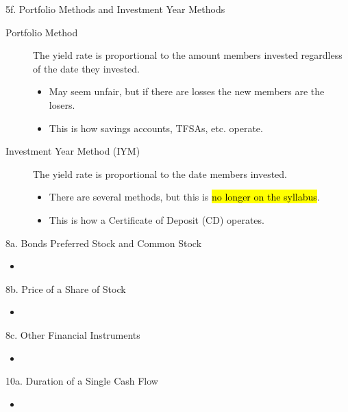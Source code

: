 \begin{CHPT_SUMM_AUTO}[label = {L.-5f}]{5f. Portfolio Methods and Investment Year Methods}
\begin{description}
	\item[Portfolio Method]	The yield rate is proportional to the amount members invested regardless of the date they invested.
		\begin{itemize}[leftmargin = *]
		\item	May seem unfair, but if there are losses the new members are the losers.
		\item	This is how savings accounts, TFSAs, etc. operate.
		\end{itemize}
	\item[Investment Year Method (IYM)]	The yield rate is proportional to the date members invested.
		\begin{itemize}[leftmargin = *]
		\item	There are several methods, but this is \hl{no longer on the syllabus}.
		\item	This is how a Certificate of Deposit (CD) operates.
		\end{itemize}
\end{description}
\end{CHPT_SUMM_AUTO}

\begin{CHPT_SUMM_AUTO}[label = {L.-8a}]{8a. Bonds Preferred Stock and Common Stock}
	\begin{itemize}
		\item	
	\end{itemize}
\end{CHPT_SUMM_AUTO}

\begin{CHPT_SUMM_AUTO}[label = {L.-8b}]{8b. Price of a Share of Stock}
	\begin{itemize}
		\item	
	\end{itemize}
\end{CHPT_SUMM_AUTO}

\begin{CHPT_SUMM_AUTO}[label = {L.-8c}]{8c. Other Financial Instruments}
	\begin{itemize}
		\item	
	\end{itemize}
\end{CHPT_SUMM_AUTO}

\begin{CHPT_SUMM_AUTO}[label = {L.-10a}]{10a. Duration of a Single Cash Flow}
	\begin{itemize}
		\item	
	\end{itemize}
\end{CHPT_SUMM_AUTO}

